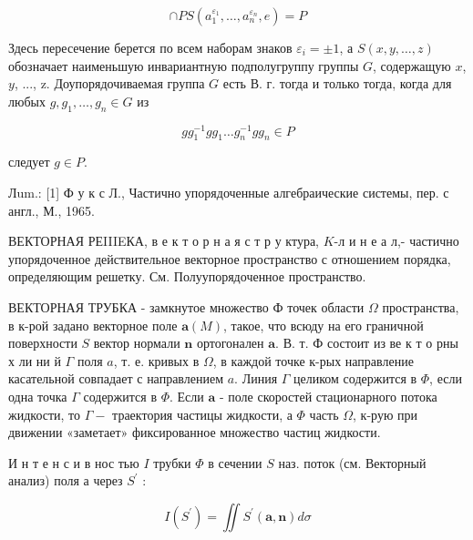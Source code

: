\documentclass[10pt]{article}
\begin{document}
\[

\cap P S\left(a_{1}^{\varepsilon_{1}}, \ldots, a_{n}^{\varepsilon_{n}}, e\right)=P

\]



Здесь пересечение берется по всем наборам знаков $\varepsilon_{i}= \pm 1$, а $S(x, y, \ldots, z)$ обозначает наименьшую инвариантную подполугруппу группы $G$, содержащую $x$, $y$, ..., z. Доупорядочиваемая группа $G$ есть В. г. тогда и только тогда, когда для любых $g, g_{1}, \ldots, g_{n} \in G$ из



\[

g g_{1}^{-1} g g_{1} \ldots g_{n}^{-1} g g_{n} \in P

\]



следует $g \in P$.



Лum.: [1] Ф у к с Л., Частично упорядоченные алгебраические системы, пер. с англ., М., 1965.



ВЕКТОРНАЯ РЕIIIEКА, в е к т о р н а я с т р у ктура, $K$-л и н е а л,- частично упорядоченное действительное векторное пространство с отношением порядка, определяющим решетку. См. Полуупорядоченное пространство.



ВЕКТОРНАЯ ТРУБКА - замкнутое множество Ф точек области $\Omega$ пространства, в к-рой задано векторное поле $\boldsymbol{a}(M)$, такое, что всюду на его граничной поверхности $S$ вектор нормали $\boldsymbol{n}$ ортогонален $\boldsymbol{a}$. В. т. Ф состоит из ве к т о рны х ли ни й $\Gamma$ поля $a$, т. е. кривых в $\Omega$, в каждой точке к-рых направление касательной совпадает с направлением $a$. Линия $\Gamma$ целиком содержится в $\Phi$, если одна точка $\Gamma$ содержится в $\Phi$. Если $\boldsymbol{a}$ - поле скоростей стационарного потока жидкости, то $\Gamma-$ траектория частицы жидкости, а $\Phi$ часть $\Omega$, к-рую при движении «заметает» фиксированное множество частиц жидкости.



И н т е н с и в нос тью $I$ трубки $\Phi$ в сечении $S$ наз. поток (см. Векторный анализ) поля а через $S^{\prime}$ :



\[

I\left(S^{\prime}\right)=\iint S^{\prime}(\boldsymbol{a}, \boldsymbol{n}) d \sigma

\]
\end{document}
